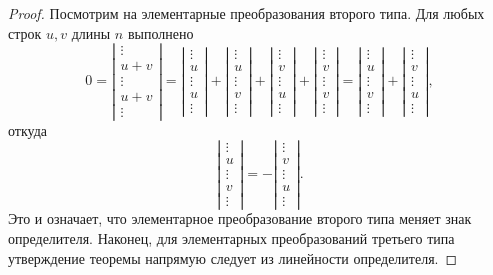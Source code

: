 \begin{proof}
Посмотрим на элементарные преобразования второго типа. Для любых строк
$u,v$ длины $n$ выполнено
$$
0 = \left|\begin{matrix}\vdots \\ u+v \\ \vdots \\ u+v \\
    \vdots \end{matrix}\right| =
\left|\begin{matrix}\vdots \\ u \\ \vdots \\ u \\
    \vdots\end{matrix}\right|+
\left|\begin{matrix}\vdots \\ u \\ \vdots \\ v \\
    \vdots\end{matrix}\right|+
\left|\begin{matrix}\vdots \\ v \\ \vdots \\ u \\
    \vdots\end{matrix}\right|+
\left|\begin{matrix}\vdots \\ v \\ \vdots \\ v \\
    \vdots\end{matrix}\right| = 
\left|\begin{matrix}\vdots \\ u \\ \vdots \\ v \\
    \vdots\end{matrix}\right|+
\left|\begin{matrix}\vdots \\ v \\ \vdots \\ u \\
    \vdots\end{matrix}\right|,
$$
откуда 
$$
\left|\begin{matrix}\vdots \\ u \\ \vdots \\ v \\
    \vdots\end{matrix}\right| = -
\left|\begin{matrix}\vdots \\ v \\ \vdots \\ u \\
    \vdots\end{matrix}\right|.
$$
Это и означает, что элементарное преобразование второго типа меняет
знак определителя. Наконец, для элементарных преобразований третьего
типа утверждение теоремы напрямую следует из линейности определителя.
\end{proof}

